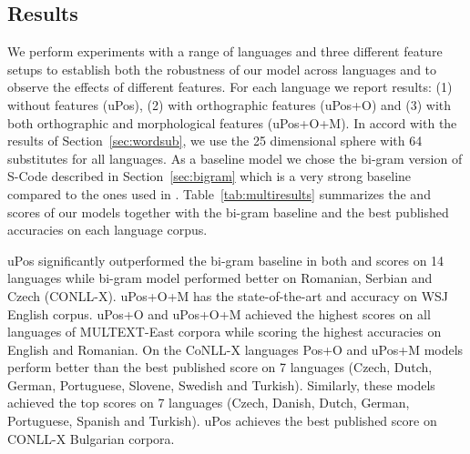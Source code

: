 \subsection{Results}
We perform experiments with a range of languages and three different
feature setups to establish both the robustness of our model across
languages and to observe the effects of different features.  For each
language we report results: (1) without features (uPos), (2) with
orthographic features (uPos+O) and (3) with both orthographic and
morphological features (uPos+O+M).  In accord with the results of
Section~\ref{sec:wordsub}, we use the 25 dimensional sphere with 64
substitutes for all languages.  As a baseline model we chose the
bi-gram version of S-Code described in Section~\ref{sec:bigram} which
is a very strong baseline compared to the ones used in
\cite{christodoulopoulos-goldwater-steedman:2011:EMNLP}.
Table~\ref{tab:multiresults} summarizes the \mto and \vm scores of our
models together with the bi-gram baseline and the best published
accuracies on each language corpus.

uPos significantly outperformed the bi-gram baseline in both \mto and
\vm scores on 14 languages while bi-gram model performed better on
Romanian, Serbian and Czech (CONLL-X).  uPos+O+M has the
state-of-the-art \mto and \vm accuracy on WSJ English corpus.  uPos+O
and uPos+O+M achieved the highest \mto scores on all languages of
MULTEXT-East corpora while scoring the highest \vm accuracies on
English and Romanian.  On the CoNLL-X languages Pos+O and uPos+M
models perform better than the best published \mto score on 7
languages (Czech, Dutch, German, Portuguese, Slovene, Swedish and
Turkish).  Similarly, these models achieved the top \vm scores on 7
languages (Czech, Danish, Dutch, German, Portuguese, Spanish and
Turkish).  uPos achieves the best published \mto score on CONLL-X
Bulgarian corpora.

